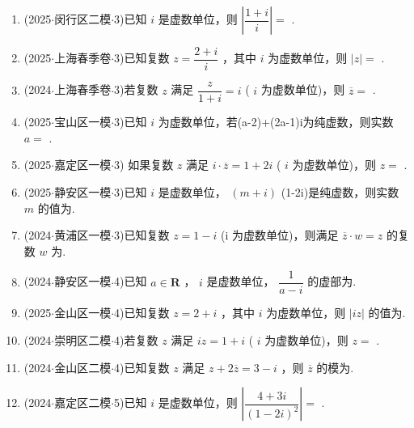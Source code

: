\begin{enumerate}
    \item (2025$\cdot$闵行区二模$\cdot$3)已知 ${i}$ 是虚数单位，则 $\left| \dfrac{1 + {i}}{{i}}\right|  =$ .

    \item (2025$\cdot$上海春季卷$\cdot$3)已知复数 $z = \dfrac{2 + {i}}{{i}}$ ，其中 ${i}$ 为虚数单位，则 $\left| z\right|  =$ .

    \item (2024$\cdot$上海春季卷$\cdot$3)若复数 $z$ 满足 $\dfrac{z}{1 + {i}} = {i}$ ( ${i}$ 为虚数单位)，则 $\overline{z} =$ .

    \item (2025$\cdot$宝山区一模$\cdot$3)已知 ${i}$ 为虚数单位，若(a-2)+(2a-1)i为纯虚数，则实数 $a =$ .

    \item (2025$\cdot$嘉定区一模$\cdot$3) 如果复数 $z$ 满足 ${i} \cdot  \overline{z} = 1 + 2{i}$ ( ${i}$ 为虚数单位)，则 $z =$ .

    \item (2025$\cdot$静安区一模$\cdot$3)已知 ${i}$ 是虚数单位， $\left( {m + {i}}\right)$ (1-2i)是纯虚数，则实数 $m$ 的值为.

    \item (2024$\cdot$黄浦区一模$\cdot$3)已知复数 $z = 1 - {i}$ (i 为虚数单位)，则满足 $\overline{z} \cdot  w = z$ 的复数 $w$ 为.

    \item (2024$\cdot$静安区一模$\cdot$4)已知 $a \in  \mathbf{R}$ ， ${i}$ 是虚数单位， $\dfrac{1}{a - {i}}$ 的虚部为.

    \item (2025$\cdot$金山区一模$\cdot$4)已知复数 $z = 2 + {i}$ ，其中 ${i}$ 为虚数单位，则 $\left| {{i}z}\right|$ 的值为.

    \item (2024$\cdot$崇明区二模$\cdot$4)若复数 $z$ 满足 ${i}z = 1 + {i}$ ( ${i}$ 为虚数单位)，则 $z =$ .

    \item (2024$\cdot$金山区二模$\cdot$4)已知复数 $z$ 满足 $z + {2\overline{z}} = 3 - {i}$ ，则 $\overline{z}$ 的模为.

    \item (2024$\cdot$嘉定区二模$\cdot$5)已知 ${i}$ 是虚数单位，则 $\left| \dfrac{4 + {3{i}}}{{\left( 1 - 2{i}\right) }^{2}}\right|  =$ .


\end{enumerate}
